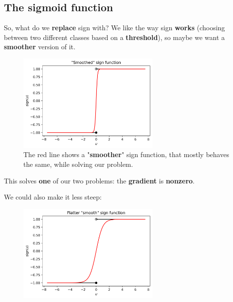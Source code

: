     \subsection{The sigmoid function}
    
        So, what do we \textbf{replace} sign with? We like the way sign \textbf{works} (choosing between two different classes based on a \textbf{threshold}), so maybe we want a \textbf{smoother} version of it.
        
        \begin{figure}[H]
            \centering
            
            \includegraphics[width=70mm,scale=0.5]{images/classification_images/smoothed_sign_function.png}
            \caption*{The red line shows a "\textbf{smoother}" sign function, that mostly behaves the same, while solving our problem.}
        \end{figure}
        
        This solves \textbf{one} of our two problems: the \textbf{gradient} is \textbf{nonzero}. 
        
        We could also make it less steep:
        
        \begin{figure}[H]
            \centering
            
            \includegraphics[width=70mm,scale=0.5]{images/classification_images/flatter_smooth_sign_function.png}
        \end{figure}
        
